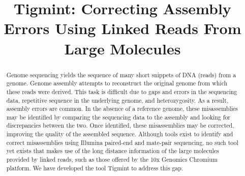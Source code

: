 \documentclass{bmcart}
\begin{document}
\begin{frontmatter}
\begin{fmbox}
\title{Tigmint: Correcting Assembly Errors Using Linked Reads From Large Molecules}
\author[addressref={aff1},corref={aff1},email={sjackman@bcgsc.ca}]
{  }
\author[addressref={aff1},email={lcoombe@bcgsc.ca}]
{  }
\author[addressref={aff1},email={jchu@bcgsc.ca}]
{  }
\author[addressref={aff1},email={rwarren@bcgsc.ca}]
{  }
\author[addressref={aff1},email={benv@bcgsc.ca}]
{  }
\author[addressref={aff1},email={sarah.yeo@alumni.ubc.ca}]
{  }
\author[addressref={aff1},email={zxue@bcgsc.ca}]
{  }
\author[addressref={aff1},email={hmohamadi@bcgsc.ca}]
{  }
\author[addressref={aff2},email={bohlmann@mail.ubc.ca}]
{  }
\author[addressref={aff1},email={sjones@bcgsc.ca}]
{  }
\author[addressref={aff1},email={ibirol@bcgsc.ca}]
{  }
\address[id=aff1]{
  ,
   ,
}
\address[id=aff2]{
  ,
   ,
}

\end{fmbox}

\begin{abstractbox}

\begin{abstract}
Genome sequencing yields the sequence of many short snippets of DNA (reads) from a genome. Genome assembly attempts to reconstruct the original genome from which these reads were derived. This task is difficult due to gaps and errors in the sequencing data, repetitive sequence in the underlying genome, and heterozygosity. As a result, assembly errors are common. In the absence of a reference genome, these misassemblies may be identified by comparing the sequencing data to the assembly and looking for discrepancies between the two. Once identified, these misassemblies may be corrected, improving the quality of the assembled sequence. Although tools exist to identify and correct misassemblies using Illumina paired-end and mate-pair sequencing, no such tool yet exists that makes use of the long distance information of the large molecules provided by linked reads, such as those offered by the 10x Genomics Chromium platform. We have developed the tool Tigmint to address this gap.


\end{abstract}
\end{abstractbox}
\end{frontmatter}
\end{document}
